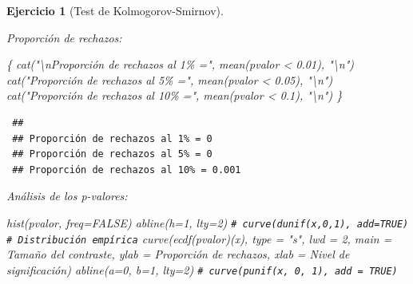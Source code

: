 \documentclass[
  10pt,
]{book}
\newenvironment{Shaded}{\begin{snugshade}}{\end{snugshade}}
\newcommand{\AttributeTok}[1]{\textcolor[rgb]{0.77,0.63,0.00}{#1}}
\newcommand{\CommentTok}[1]{\textcolor[rgb]{0.56,0.35,0.01}{\textit{#1}}}
\newcommand{\ConstantTok}[1]{\textcolor[rgb]{0.00,0.00,0.00}{#1}}
\newcommand{\DecValTok}[1]{\textcolor[rgb]{0.00,0.00,0.81}{#1}}
\newcommand{\FloatTok}[1]{\textcolor[rgb]{0.00,0.00,0.81}{#1}}
\newcommand{\FunctionTok}[1]{\textcolor[rgb]{0.00,0.00,0.00}{#1}}
\newcommand{\NormalTok}[1]{#1}
\newcommand{\SpecialCharTok}[1]{\textcolor[rgb]{0.00,0.00,0.00}{#1}}
\newcommand{\StringTok}[1]{\textcolor[rgb]{0.31,0.60,0.02}{#1}}
\theoremstyle{break}
\newtheorem{exercise}{Ejercicio}[chapter]
\theoremstyle{nonumberplain}
\renewcommand{\CommentTok}[1]{\textcolor[rgb]{0.41,0.41,0.41}{\texttt{#1}}}
\begin{document}
\begin{exercise}[Test de Kolmogorov-Smirnov]
\begin{enumerate}
  Proporción de rechazos:

\begin{Shaded}
\begin{Highlighting}[]
\NormalTok{\{}
  \FunctionTok{cat}\NormalTok{(}\StringTok{"}\SpecialCharTok{\textbackslash{}n}\StringTok{Proporción de rechazos al 1\% ="}\NormalTok{, }\FunctionTok{mean}\NormalTok{(pvalor }\SpecialCharTok{\textless{}} \FloatTok{0.01}\NormalTok{), }\StringTok{"}\SpecialCharTok{\textbackslash{}n}\StringTok{"}\NormalTok{)}
  \FunctionTok{cat}\NormalTok{(}\StringTok{"Proporción de rechazos al 5\% ="}\NormalTok{, }\FunctionTok{mean}\NormalTok{(pvalor }\SpecialCharTok{\textless{}} \FloatTok{0.05}\NormalTok{), }\StringTok{"}\SpecialCharTok{\textbackslash{}n}\StringTok{"}\NormalTok{)}
  \FunctionTok{cat}\NormalTok{(}\StringTok{"Proporción de rechazos al 10\% ="}\NormalTok{, }\FunctionTok{mean}\NormalTok{(pvalor }\SpecialCharTok{\textless{}} \FloatTok{0.1}\NormalTok{), }\StringTok{"}\SpecialCharTok{\textbackslash{}n}\StringTok{"}\NormalTok{)}
\NormalTok{\}}
\end{Highlighting}
\end{Shaded}

\begin{verbatim}
 ## 
 ## Proporción de rechazos al 1% = 0 
 ## Proporción de rechazos al 5% = 0 
 ## Proporción de rechazos al 10% = 0.001
\end{verbatim}

  Análisis de los p-valores:

\begin{Shaded}
\begin{Highlighting}[]
\FunctionTok{hist}\NormalTok{(pvalor, }\AttributeTok{freq=}\ConstantTok{FALSE}\NormalTok{)}
\FunctionTok{abline}\NormalTok{(}\AttributeTok{h=}\DecValTok{1}\NormalTok{, }\AttributeTok{lty=}\DecValTok{2}\NormalTok{)   }\CommentTok{\# curve(dunif(x,0,1), add=TRUE)}
\CommentTok{\# Distribución empírica}
\FunctionTok{curve}\NormalTok{(}\FunctionTok{ecdf}\NormalTok{(pvalor)(x), }\AttributeTok{type =} \StringTok{"s"}\NormalTok{, }\AttributeTok{lwd =} \DecValTok{2}\NormalTok{, }
      \AttributeTok{main =} \StringTok{\textquotesingle{}Tamaño del contraste\textquotesingle{}}\NormalTok{, }\AttributeTok{ylab =} \StringTok{\textquotesingle{}Proporción de rechazos\textquotesingle{}}\NormalTok{, }
      \AttributeTok{xlab =} \StringTok{\textquotesingle{}Nivel de significación\textquotesingle{}}\NormalTok{)}
\FunctionTok{abline}\NormalTok{(}\AttributeTok{a=}\DecValTok{0}\NormalTok{, }\AttributeTok{b=}\DecValTok{1}\NormalTok{, }\AttributeTok{lty=}\DecValTok{2}\NormalTok{)   }\CommentTok{\# curve(punif(x, 0, 1), add = TRUE)}
\end{Highlighting}
\end{Shaded}


\end{enumerate}
\end{exercise}
\end{document}
